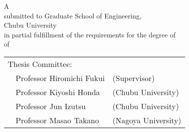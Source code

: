 \thispagestyle{empty}
\vspace*{8.9truecm}
\begin{center}
 A \edoctitle \\
 submitted to Graduate School of Engineering, \\
 Chubu University \\
 in partial fulfillment of the requirements for the degree of \\
 {\degree} of \major \\
 \bigskip

 \eauthor

 \vspace*{4.8truemm}

 \centering
 \begin{tabular}[t]{p{}ll}
  \multicolumn{2}{l}{Thesis Committee:} \\
  & Professor Hiromichi Fukui & (Supervisor) \\
  & Professor Kiyoshi Honda & (Chubu University) \\
  & Professor Jun Izutsu & (Chubu University) \\
  & Professor Masao Takano & (Nagoya University)
 \end{tabular}
\end{center}